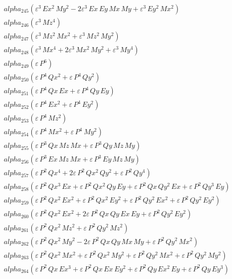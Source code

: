 \documentclass{article}
\begin{document}
\begin{align*}
  &\quad alpha_{245} \left(ε^{3}\,Ex^{2}\,My^{2} - 2ε^{3}\,Ex\,Ey\,Mx\,My + ε^{3}\,Ey^{2}\,Mx^{2}\right) \\
  &\quad alpha_{246} \left(ε^{3}\,Mz^{4}\right) \\
  &\quad alpha_{247} \left(ε^{3}\,Mz^{2}\,Mx^{2} + ε^{3}\,Mz^{2}\,My^{2}\right) \\
  &\quad alpha_{248} \left(ε^{3}\,Mx^{4} + 2ε^{3}\,Mx^{2}\,My^{2} + ε^{3}\,My^{4}\right) \\
  &\quad alpha_{249} \left(ε\,P^{6}\right) \\
  &\quad alpha_{250} \left(ε\,P^{4}\,Qx^{2} + ε\,P^{4}\,Qy^{2}\right) \\
  &\quad alpha_{251} \left(ε\,P^{4}\,Qx\,Ex + ε\,P^{4}\,Qy\,Ey\right) \\
  &\quad alpha_{252} \left(ε\,P^{4}\,Ex^{2} + ε\,P^{4}\,Ey^{2}\right) \\
  &\quad alpha_{253} \left(ε\,P^{4}\,Mz^{2}\right) \\
  &\quad alpha_{254} \left(ε\,P^{4}\,Mx^{2} + ε\,P^{4}\,My^{2}\right) \\
  &\quad alpha_{255} \left(ε\,P^{3}\,Qx\,Mz\,Mx + ε\,P^{3}\,Qy\,Mz\,My\right) \\
  &\quad alpha_{256} \left(ε\,P^{3}\,Ex\,Mz\,Mx + ε\,P^{3}\,Ey\,Mz\,My\right) \\
  &\quad alpha_{257} \left(ε\,P^{2}\,Qx^{4} + 2ε\,P^{2}\,Qx^{2}\,Qy^{2} + ε\,P^{2}\,Qy^{4}\right) \\
  &\quad alpha_{258} \left(ε\,P^{2}\,Qx^{3}\,Ex + ε\,P^{2}\,Qx^{2}\,Qy\,Ey + ε\,P^{2}\,Qx\,Qy^{2}\,Ex + ε\,P^{2}\,Qy^{3}\,Ey\right) \\
  &\quad alpha_{259} \left(ε\,P^{2}\,Qx^{2}\,Ex^{2} + ε\,P^{2}\,Qx^{2}\,Ey^{2} + ε\,P^{2}\,Qy^{2}\,Ex^{2} + ε\,P^{2}\,Qy^{2}\,Ey^{2}\right) \\
  &\quad alpha_{260} \left(ε\,P^{2}\,Qx^{2}\,Ex^{2} + 2ε\,P^{2}\,Qx\,Qy\,Ex\,Ey + ε\,P^{2}\,Qy^{2}\,Ey^{2}\right) \\
  &\quad alpha_{261} \left(ε\,P^{2}\,Qx^{2}\,Mz^{2} + ε\,P^{2}\,Qy^{2}\,Mz^{2}\right) \\
  &\quad alpha_{262} \left(ε\,P^{2}\,Qx^{2}\,My^{2} - 2ε\,P^{2}\,Qx\,Qy\,Mx\,My + ε\,P^{2}\,Qy^{2}\,Mx^{2}\right) \\
  &\quad alpha_{263} \left(ε\,P^{2}\,Qx^{2}\,Mx^{2} + ε\,P^{2}\,Qx^{2}\,My^{2} + ε\,P^{2}\,Qy^{2}\,Mx^{2} + ε\,P^{2}\,Qy^{2}\,My^{2}\right) \\
  &\quad alpha_{264} \left(ε\,P^{2}\,Qx\,Ex^{3} + ε\,P^{2}\,Qx\,Ex\,Ey^{2} + ε\,P^{2}\,Qy\,Ex^{2}\,Ey + ε\,P^{2}\,Qy\,Ey^{3}\right) \\

\end{align*}
\end{document}
